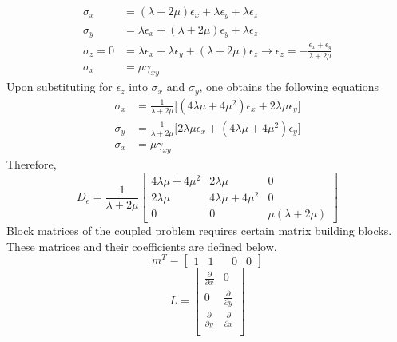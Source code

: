 \documentclass[12pt]{article}
\begin{document}
\begin{equation}
\begin{split}
\sigma_{x} &= (\lambda+2\mu)\epsilon_x+\lambda\epsilon_y+\lambda\epsilon_z	\\
\sigma_{y} &= \lambda\epsilon_x+(\lambda+2\mu)\epsilon_y+\lambda\epsilon_z	\\
\sigma_{z} = 0 &= \lambda\epsilon_x+\lambda\epsilon_y+(\lambda+2\mu)\epsilon_z	\to \epsilon_z = -\frac{\epsilon_x+\epsilon_y}{\lambda+2\mu} \\
\sigma_{x} &= \mu\gamma_{xy}
\end{split}
\end{equation}
%
Upon substituting for $\epsilon_z$ into $\sigma_{x}$ and $\sigma_{y}$, one obtains the following equations
%
\begin{equation}
\begin{split}
\sigma_{x} &=\frac{1}{\lambda+2\mu}\big[(4\lambda\mu+4\mu^2)\epsilon_x+2\lambda\mu\epsilon_y\big]	\\
\sigma_{y} &= \frac{1}{\lambda+2\mu}\big[2\lambda\mu\epsilon_x+(4\lambda\mu+4\mu^2)\epsilon_y\big]		\\
\sigma_{x} &= \mu\gamma_{xy}
\end{split}
\end{equation}
%
Therefore,
%
\begin{equation}	\label{eq45b}
D_e = \frac{1}{\lambda+2\mu}
\left[
\begin{array}{ccc}
4\lambda\mu+4\mu^2 & 2\lambda\mu & 0 			\\
2\lambda\mu &4\lambda\mu+4\mu^2 & 0 			\\
0 & 0 & \mu(\lambda+2\mu) 		
\end{array}
\right]
\end{equation}
%
Block matrices of the coupled problem requires certain matrix building blocks. These matrices and their coefficients are defined below.
%
\begin{equation}	\label{eq42bb}
m^T=\left[
\begin{array}{cccccc}
1&1&&0&0
\end{array}
\right]
\end{equation}
%
\begin{equation}	\label{eq43b}
L = \left[
\begin{array}{cc}
\frac{\partial}{\partial x} & 0   			\\
0 &\frac{\partial}{\partial y} 				\\
\frac{\partial}{\partial y} & \frac{\partial}{\partial x}   			\\
\end{array}
\right]
\end{equation}
\end{document}
